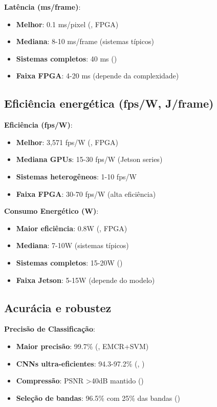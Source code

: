 \textbf{Latência (ms/frame)}:
\begin{itemize}
    \item \textbf{Melhor}: 0.1 ms/pixel (\textcite{Martins2019}, FPGA)
    \item \textbf{Mediana}: 8-10 ms/frame (sistemas típicos)
    \item \textbf{Sistemas completos}: 40 ms (\textcite{Shin2020})
    \item \textbf{Faixa FPGA}: 4-20 ms (depende da complexidade)
\end{itemize}

\subsection{Eficiência energética (fps/W, J/frame)}\label{subsec:eficiencia_energetica}

\textbf{Eficiência (fps/W)}:
\begin{itemize}
    \item \textbf{Melhor}: 3,571 fps/W (\textcite{Martins2019}, FPGA)
    \item \textbf{Mediana GPUs}: 15-30 fps/W (Jetson series)
    \item \textbf{Sistemas heterogêneos}: 1-10 fps/W
    \item \textbf{Faixa FPGA}: 30-70 fps/W (alta eficiência)
\end{itemize}

\textbf{Consumo Energético (W)}:
\begin{itemize}
    \item \textbf{Maior eficiência}: 0.8W (\textcite{Hwang2011}, FPGA)
    \item \textbf{Mediana}: 7-10W (sistemas típicos)
    \item \textbf{Sistemas completos}: 15-20W (\textcite{Shin2020})
    \item \textbf{Faixa Jetson}: 5-15W (depende do modelo)
\end{itemize}

\subsection{Acurácia e robustez}\label{subsec:acuracia_robustez}

\textbf{Precisão de Classificação}:
\begin{itemize}
    \item \textbf{Maior precisão}: 99.7\% (\textcite{Martins2019}, EMCR+SVM)
    \item \textbf{CNNs ultra-eficientes}: 94.3-97.2\% (\textcite{TakuNet2024}, \textcite{Chen2024})
    \item \textbf{Compressão}: PSNR >40dB mantido (\textcite{Diaz2019})
    \item \textbf{Seleção de bandas}: 96.5\% com 25\% das bandas (\textcite{Wang2024})
\end{itemize}

